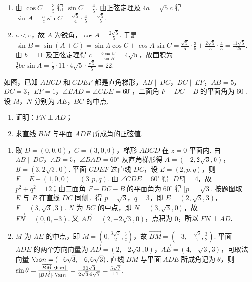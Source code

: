 \begin{solution}
\begin{enumerate}
\item 由 \(\cos C=\frac35\) 得 \(\sin C=\frac45\). 由正弦定理及 \(4a=\sqrt5c\) 得 \(\sin A=\frac{a}{c}\sin C=\frac{\sqrt5}4\cdot\frac45=\frac{\sqrt5}5\).
\item \(a<c\)，故 \(A\) 为锐角，\(\cos A=\frac{2\sqrt5}5\). 于是 \(\sin B=\sin(A+C)=\sin A\cos C+\cos A\sin C=\frac{\sqrt5}5\cdot\frac35+\frac{2\sqrt5}5\cdot\frac45=\frac{11\sqrt5}{25}\). 由 \(b=11\) 及正弦定理得 \(c=\frac{b\sin C}{\sin B}=4\sqrt5\)，故面积为 \(\frac12bc\sin A=\frac12\cdot11\cdot4\sqrt5\cdot\frac{\sqrt5}5=22\).
\end{enumerate}
\end{solution}

\begin{problem}
如图，已知 \(ABCD\) 和 \(CDEF\) 都是直角梯形，\(AB\parallel DC\)，\(DC\parallel EF\)，\(AB=5\)，\(DC=3\)，\(EF=1\)，\(\angle BAD=\angle CDE=60^\circ\)，二面角 \(F-DC-B\) 的平面角为 \(60^\circ\). 设 \(M\)，\(N\) 分别为 \(AE\)，\(BC\) 的中点.

\begin{enumerate}
\item 证明：\(FN\perp AD\)；

\item 求直线 \(BM\) 与平面 \(ADE\) 所成角的正弦值.
\end{enumerate}

\end{problem}

\begin{solution}
\begin{enumerate}
\item 取 \(D=(0,0,0)\)，\(C=(3,0,0)\)，梯形 \(ABCD\) 在 \(z=0\) 平面内. 由 \(AB\parallel DC\)，\(AB=5\)，\(\angle BAD=60^\circ\) 及直角梯形得 \(A=(-2,2\sqrt3,0)\)，\(B=(3,2\sqrt3,0)\). 平面 \(CDEF\) 过直线 \(DC\)，设 \(E=(2,p,q)\)，则 \(F=E+(1,0,0)=(3,p,q)\). 由 \(\angle CDE=60^\circ\) 得 \(|DE|=4\)，故 \(p^2+q^2=12\)；由二面角 \(F-DC-B\) 的平面角为 \(60^\circ\) 得 \(|p|=\sqrt3\). 按题图取 \(E\) 与 \(B\) 在直线 \(DC\) 同侧，得 \(p=\sqrt3\)，\(q=3\)，即 \(E=(2,\sqrt3,3)\)，\(F=(3,\sqrt3,3)\). \(N\) 为 \(BC\) 的中点，即 \(N=(3,\sqrt3,0)\)，故 \(\overrightarrow{FN}=(0,0,-3)\). 又 \(\overrightarrow{AD}=(2,-2\sqrt3,0)\)，点积为 \(0\)，所以 \(FN\perp AD\).
\item \(M\) 为 \(AE\) 的中点，即 \(M=(0,\frac{3\sqrt3}2,\frac32)\)，故 \(\overrightarrow{BM}=(-3,-\frac{\sqrt3}2,\frac32)\). 平面 \(ADE\) 的两个方向向量为 \(\overrightarrow{AD}=(2,-2\sqrt3,0)\)，\(\overrightarrow{AE}=(4,-\sqrt3,3)\)，可取法向量 \(\bs n=(-6\sqrt3,-6,6\sqrt3)\). 直线 \(BM\) 与平面 \(ADE\) 所成角记为 \(\theta\)，则 \(\sin\theta=\frac{|\overrightarrow{BM}\cdot\bs n|}{|\overrightarrow{BM}|\cdot|\bs n|}=\frac{30\sqrt3}{2\sqrt3\cdot6\sqrt7}=\frac{5\sqrt7}{14}\).
\end{enumerate}
\end{solution}

